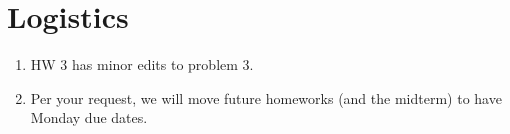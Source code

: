 \section{Logistics}

\begin{enumerate}
\item HW 3 has minor edits to problem 3.
\item Per your request, we will move future homeworks (and the midterm)
  to have Monday due dates.
\end{enumerate}
